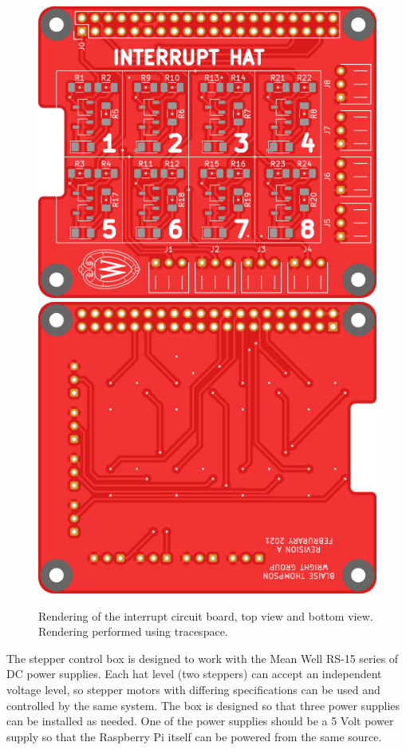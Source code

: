 \begin{figure}
\includegraphics{opa400/images/interrupt_top}
\includegraphics{opa400/images/interrupt_bottom}
\caption[Interrupt Hat Circuit Board]{
Rendering of the interrupt circuit board, top view and bottom view.
Rendering performed using tracespace\cite{}.
}
\label{opa4:fig:interrupt_board}
\end{figure}

The stepper control box is designed to work with the Mean Well RS-15 series of DC power supplies\cite{}.
Each hat level (two steppers) can accept an independent voltage level, so stepper motors with differing specifications can be used and controlled by the same system.
The box is designed so that three power supplies can be installed as needed.
One of the power supplies should be a 5 Volt power supply so that the Raspberry Pi itself can be powered from the same source.

